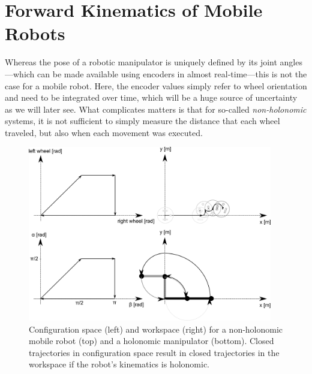 \section{Forward Kinematics of Mobile Robots}\label{sec:fwkmobile}
Whereas the pose of a robotic manipulator is uniquely defined by its joint angles---which can be made available using encoders in almost real-time---this is not the case for a mobile robot. Here, the encoder values simply refer to wheel orientation and need to be integrated over time, which will be a huge source of uncertainty as we will later see.
What complicates matters is that for so-called \emph{non-holonomic} systems, it is not sufficient to simply measure the distance that each wheel traveled, but also when each movement was executed. 

\begin{figure}[htb!]
	\centering
		\includegraphics[width=0.95\textwidth]{figs/holonomy.png}
	\caption{Configuration space (left) and workspace (right) for a non-holonomic mobile robot (top) and a holonomic manipulator (bottom). Closed trajectories in configuration space result in closed trajectories in the workspace if the robot's kinematics is holonomic.}
	\label{fig:holonomy}
\end{figure}

